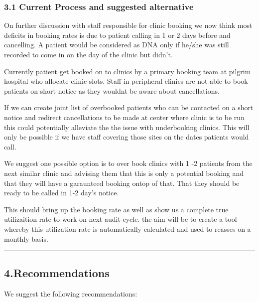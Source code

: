 \documentclass[]{article}
\begin{document}
\hypertarget{current-process-and-suggested-alternative}{%
\subsubsection{3.1 Current Process and suggested
alternative}\label{current-process-and-suggested-alternative}}

On further discussion with staff responsible for clinic booking we now
think most deficits in booking rates is due to patient calling in 1 or 2
days before and cancelling. A patient would be considered as DNA only if
he/she was still recorded to come in on the day of the clinic but
didn't.

Currently patient get booked on to clinics by a primary booking team at
pilgrim hospital who allocate clinic slots. Staff in peripheral clinics
are not able to book patients on short notice as they wouldnt be aware
about cancellations.

If we can create joint list of overbooked patients who can be contacted
on a short notice and redirect cancellations to be made at center where
clinic is to be run this could potentially alleviate the the issue with
underbooking clinics. This will only be possible if we have staff
covering those sites on the dates patients would call.

We suggest one possible option is to over book clinics with 1 -2
patients from the next similar clinic and advising them that this is
only a potential booking and that they will have a garaunteed booking
ontop of that. That they should be ready to be called in 1-2 day's
notice.

This should bring up the booking rate as well as show us a complete true
utilizaition rate to work on next audit cycle. the aim will be to create
a tool whereby this utilization rate is automatically calculated and
used to reasses on a monthly basis.

\begin{center}\rule{0.5\linewidth}{0.5pt}\end{center}

\hypertarget{recommendations}{%
\subsection{4.Recommendations}\label{recommendations}}

We suggest the following recommendations:
\end{document}
